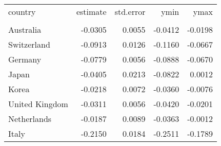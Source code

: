 \begin{tabular}{lrrrr}
   \toprule 
 
country & estimate & std.error & ymin & ymax \\ 

\cmidrule(lr){1-5} 
 
\\[-1.8ex]  
 
Australia & -0.0305 & 0.0055 & -0.0412 & -0.0198 \\ 
  Switzerland & -0.0913 & 0.0126 & -0.1160 & -0.0667 \\ 
  Germany & -0.0779 & 0.0056 & -0.0888 & -0.0670 \\ 
  Japan & -0.0405 & 0.0213 & -0.0822 & 0.0012 \\ 
  Korea & -0.0218 & 0.0072 & -0.0360 & -0.0076 \\ 
  United Kingdom & -0.0311 & 0.0056 & -0.0420 & -0.0201 \\ 
  Netherlands & -0.0187 & 0.0089 & -0.0363 & -0.0012 \\ 
  Italy & -0.2150 & 0.0184 & -0.2511 & -0.1789 \\ 
   \bottomrule  
\end{tabular}
